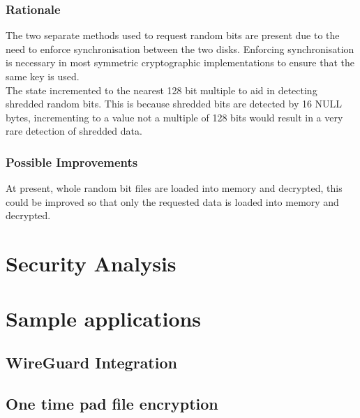 \documentclass{paper}
\begin{document}
				\subsubsection{Rationale}
					The two separate methods used to request random bits are present due to the need to enforce synchronisation between the two disks. Enforcing synchronisation is necessary in most symmetric cryptographic implementations to ensure that the same key is used.\\ 
					
					The state incremented to the nearest 128 bit multiple to aid in detecting shredded random bits. This is because shredded bits are detected by 16 NULL bytes, incrementing to a value not a multiple of 128 bits would result in a very rare detection of shredded data.
				\subsubsection{Possible Improvements}
					At present, whole random bit files are loaded into memory and decrypted, this could be improved so that only the requested data is loaded into memory and decrypted.\\			
				
		
		\section{Security Analysis}
		\section{Sample applications}
			\subsection{WireGuard Integration}
			\subsection{One time pad file encryption}
		
						
\end{document}
